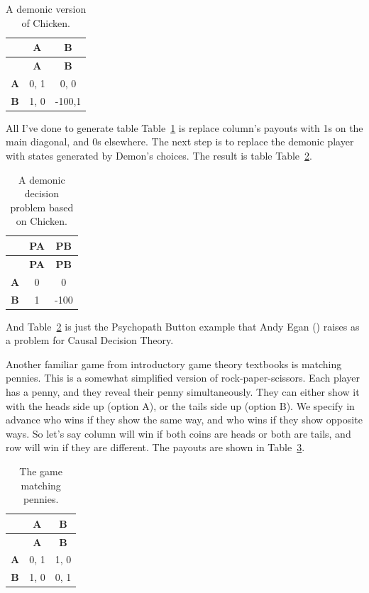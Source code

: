 \documentclass[
  12pt,
  letterpaper,
  DIV=11,
  numbers=noendperiod]{scrreprt}
\begin{document}
\begin{longtable}[]{@{}ccc@{}}
\caption{A demonic version of
Chicken.}\label{tbl-demon-chicken}\tabularnewline
\toprule\noalign{}
& \textbf{A} & \textbf{B} \\
\midrule\noalign{}
\endfirsthead
\toprule\noalign{}
& \textbf{A} & \textbf{B} \\
\midrule\noalign{}
\endhead
\bottomrule\noalign{}
\endlastfoot
\textbf{A} & 0, 1 & 0, 0 \\
\textbf{B} & 1, 0 & -100,1 \\
\end{longtable}

All I've done to generate table Table~\ref{tbl-demon-chicken} is replace
column's payouts with 1s on the main diagonal, and 0s elsewhere. The
next step is to replace the demonic player with states generated by
Demon's choices. The result is table Table~\ref{tbl-egan-game}.

\begin{longtable}[]{@{}ccc@{}}
\caption{A demonic decision problem based on
Chicken.}\label{tbl-egan-game}\tabularnewline
\toprule\noalign{}
& \textbf{PA} & \textbf{PB} \\
\midrule\noalign{}
\endfirsthead
\toprule\noalign{}
& \textbf{PA} & \textbf{PB} \\
\midrule\noalign{}
\endhead
\bottomrule\noalign{}
\endlastfoot
\textbf{A} & 0 & 0 \\
\textbf{B} & 1 & -100 \\
\end{longtable}

And Table~\ref{tbl-egan-game} is just the Psychopath Button example that
Andy Egan () raises as a problem for
Causal Decision Theory.

Another familiar game from introductory game theory textbooks is
matching pennies. This is a somewhat simplified version of
rock-paper-scissors. Each player has a penny, and they reveal their
penny simultaneously. They can either show it with the heads side up
(option A), or the tails side up (option B). We specify in advance who
wins if they show the same way, and who wins if they show opposite ways.
So let's say column will win if both coins are heads or both are tails,
and row will win if they are different. The payouts are shown in
Table~\ref{tbl-match-pennies}.

\begin{longtable}[]{@{}ccc@{}}
\caption{The game matching
pennies.}\label{tbl-match-pennies}\tabularnewline
\toprule\noalign{}
& \textbf{A} & \textbf{B} \\
\midrule\noalign{}
\endfirsthead
\toprule\noalign{}
& \textbf{A} & \textbf{B} \\
\midrule\noalign{}
\endhead
\bottomrule\noalign{}
\endlastfoot
\textbf{A} & 0, 1 & 1, 0 \\
\textbf{B} & 1, 0 & 0, 1 \\
\end{longtable}
\end{document}
